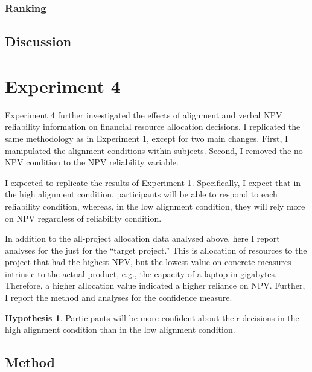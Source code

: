 \documentclass[a4paper, nobind, dvipsnames]{templates/ociamthesis}
\theoremstyle{definition}
\theoremstyle{definition}
\theoremstyle{definition}
\theoremstyle{definition}
\newtheorem{hypothesis}{Hypothesis}[chapter]
\theoremstyle{remark}
\begin{document}
\hypertarget{ranking-2}{%
\subsubsection{Ranking}\label{ranking-2}}

\hypertarget{discussion-alignment-3}{%
\subsection{Discussion}\label{discussion-alignment-3}}

\hypertarget{alignment-1}{%
\section{Experiment 4}\label{alignment-1}}

Experiment 4 further investigated the effects of alignment and verbal NPV
reliability information on financial resource allocation decisions. I replicated
the same methodology as in \protect\hyperlink{method-alignment-2}{Experiment 1}, except for two
main changes. First, I manipulated the alignment conditions within subjects.
Second, I removed the no NPV condition to the NPV reliability variable.

I expected to replicate the results of \protect\hyperlink{results-alignment-2}{Experiment 1}.
Specifically, I expect that in the high alignment condition, participants will
be able to respond to each reliability condition, whereas, in the low alignment
condition, they will rely more on NPV regardless of reliability condition.

In addition to the all-project allocation data analysed above, here I report
analyses for the just for the ``target project.'' This is allocation of resources
to the project that had the highest NPV, but the lowest value on concrete
measures intrinsic to the actual product, e.g., the capacity of a laptop in
gigabytes. Therefore, a higher allocation value indicated a higher reliance on
NPV. Further, I report the method and analyses for the confidence measure.

\begin{hypothesis}
\protect\hypertarget{hyp:confidence-alignment-alignment-1}{}{\label{hyp:confidence-alignment-alignment-1} }Participants will be more confident about their decisions in the high alignment
condition than in the low alignment condition.
\end{hypothesis}

\hypertarget{method-alignment-1}{%
\subsection{Method}\label{method-alignment-1}}
\end{document}
